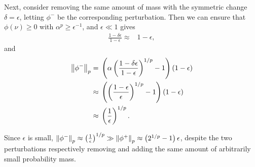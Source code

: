 \begin{ex}
Next, consider removing the same amount of mass with the symmetric change
$\delta = \epsilon$, letting $\phi^-$ be the corresponding perturbation. Then we
can ensure that $\phi(\nu) \ge 0$ with $\alpha^p \ge \epsilon^{-1}$, and
$\epsilon \ll 1$ gives
%
\begin{align*}
%
\frac{1-\delta\epsilon}{1 - \epsilon} \approx{}& 1- \epsilon,
%
\end{align*}
%
and
%
\begin{align*}
%
\norm{\phi^-}_p  ={}&
    \left( \alpha\left(\frac{1-\delta \epsilon}{1-\epsilon} \right)^{1/p} - 1
    \right) (1- \epsilon)
\\\approx{}&
\left(\left(\frac{1- \epsilon}{\epsilon}  \right)^{1/p} - 1\right)(1 - \epsilon)
%
\\\approx{}&
    \left( \frac{1}{\epsilon}\right)^{1/p}.
%
\end{align*}

Since $\epsilon$ is small, $\left\Vert\phi^-\right\Vert_p \approx \left(
\frac{1}{\epsilon}\right)^{1/p} \gg \left\Vert\phi^+\right\Vert_p \approx \left( 2^{1/p} - 1
\right) \epsilon$, despite the two perturbations respectively removing and
adding the same amount of arbitrarily small probability mass.

\end{ex}
